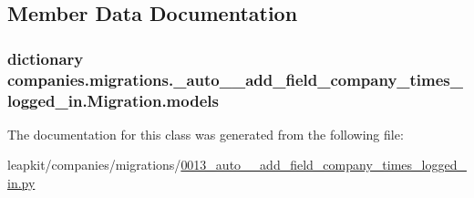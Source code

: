 \subsection{Member Data Documentation}
\hypertarget{classcompanies_1_1migrations_1_10013__auto____add__field__company__times__logged__in_1_1_migration_a58b872b3318cb4640a16f594915a5dcf}{
\subsubsection[{models}]{\setlength{\rightskip}{0pt plus 5cm}dictionary companies.\-migrations.\-\_\-auto\-\_\-\-\_\-add\-\_\-field\-\_\-company\-\_\-times\-\_\-logged\-\_\-in.\-Migration.\-models\hspace{0.3cm}{\ttfamily [static]}}}\label{classcompanies_1_1migrations_1_10013__auto____add__field__company__times__logged__in_1_1_migration_a58b872b3318cb4640a16f594915a5dcf}


The documentation for this class was generated from the following file\-:\begin{DoxyCompactItemize}
\item 
leapkit/companies/migrations/\hyperlink{0013__auto____add__field__company__times__logged__in_8py}{0013\-\_\-auto\-\_\-\-\_\-add\-\_\-field\-\_\-company\-\_\-times\-\_\-logged\-\_\-in.\-py}\end{DoxyCompactItemize}
